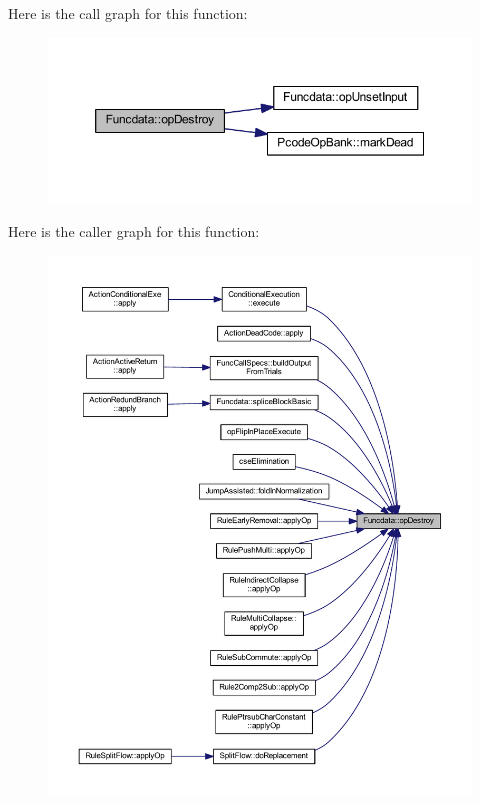 Here is the call graph for this function\+:
\nopagebreak
\begin{figure}[H]
\begin{center}
\leavevmode
\includegraphics[width=350pt]{class_funcdata_a6976625d7b40efca0bc9941cb199ee44_cgraph}
\end{center}
\end{figure}
Here is the caller graph for this function\+:
\nopagebreak
\begin{figure}[H]
\begin{center}
\leavevmode
\includegraphics[width=350pt]{class_funcdata_a6976625d7b40efca0bc9941cb199ee44_icgraph}
\end{center}
\end{figure}
\mbox{\label{class_funcdata_aeef2a6be0e9c641f72bf4e87020ddf37}} 

